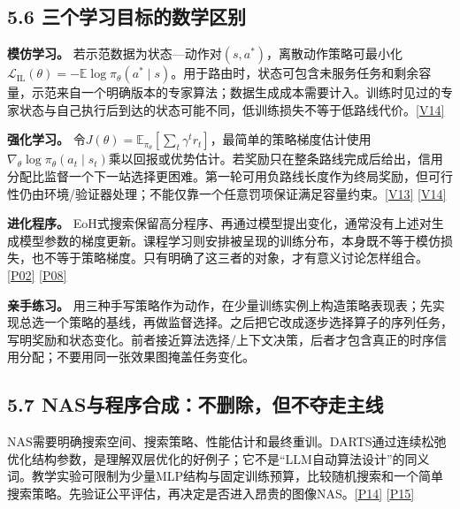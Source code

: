 \subsection{5.6
三个学习目标的数学区别}\label{ux4e09ux4e2aux5b66ux4e60ux76eeux6807ux7684ux6570ux5b66ux533aux522b}

\textbf{模仿学习。}
若示范数据为状态---动作对\((s,a^*)\)，离散动作策略可最小化\(\mathcal L_{\mathrm{IL}}(\theta)=-\mathbb E\log\pi_\theta(a^*\mid s)\)。用于路由时，状态可包含未服务任务和剩余容量，示范来自一个明确版本的专家算法；数据生成成本需要计入。训练时见过的专家状态与自己执行后到达的状态可能不同，低训练损失不等于低路线代价。\href{https://rail.eecs.berkeley.edu/deeprlcourse/}{{[}V14{]}}

\textbf{强化学习。}
令\(J(\theta)=\mathbb E_{\pi_\theta}[\sum_t\gamma^t r_t]\)，最简单的策略梯度估计使用\(\nabla_\theta\log\pi_\theta(a_t\mid s_t)\)乘以回报或优势估计。若奖励只在整条路线完成后给出，信用分配比监督一个下一站选择更困难。第一轮可用负路线长度作为终局奖励，但可行性仍由环境/验证器处理；不能仅靠一个任意罚项保证满足容量约束。\href{https://www.davidsilver.uk/teaching/}{{[}V13{]}}
\href{https://rail.eecs.berkeley.edu/deeprlcourse/}{{[}V14{]}}

\textbf{进化程序。}
EoH式搜索保留高分程序、再通过模型提出变化，通常没有上述对生成模型参数的梯度更新。课程学习则安排被呈现的训练分布，本身既不等于模仿损失，也不等于策略梯度。只有明确了这三者的对象，才有意义讨论怎样组合。\href{https://arxiv.org/abs/2401.02051}{{[}P02{]}}
\href{https://arxiv.org/abs/2504.05108}{{[}P08{]}}

\textbf{亲手练习。}
用三种手写策略作为动作，在少量训练实例上构造策略表现表；先实现总选一个策略的基线，再做监督选择。之后把它改成逐步选择算子的序列任务，写明奖励和状态变化。前者接近算法选择/上下文决策，后者才包含真正的时序信用分配；不要用同一张效果图掩盖任务变化。

\subsection{5.7
NAS与程序合成：不删除，但不夺走主线}\label{nasux4e0eux7a0bux5e8fux5408ux6210ux4e0dux5220ux9664ux4f46ux4e0dux593aux8d70ux4e3bux7ebf}

NAS需要明确搜索空间、搜索策略、性能估计和最终重训。DARTS通过连续松弛优化结构参数，是理解双层优化的好例子；它不是``LLM自动算法设计''的同义词。教学实验可限制为少量MLP结构与固定训练预算，比较随机搜索和一个简单搜索策略。先验证公平评估，再决定是否进入昂贵的图像NAS。\href{https://arxiv.org/abs/1806.09055}{{[}P14{]}}
\href{https://arxiv.org/abs/1808.05377}{{[}P15{]}}

